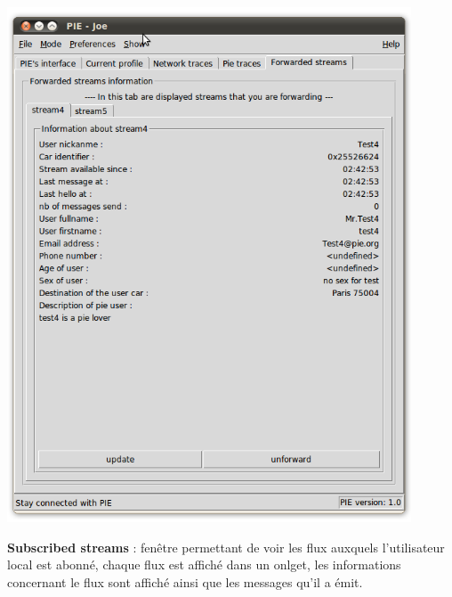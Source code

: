\begin{center}
    \includegraphics[width=0.9\textwidth]{img/forwarded.png}
\end{center}

\textbf{Subscribed streams} : fenêtre permettant de voir les flux auxquels l'utilisateur local est abonné, chaque flux est affiché dans un onlget,
les informations concernant le flux sont affiché ainsi que les messages qu'il a émit.\\

